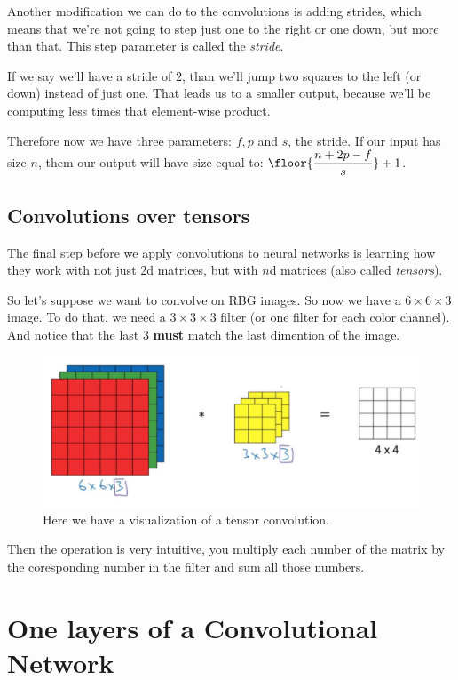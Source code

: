 \documentclass[12pt, a4paper, oneside]{book}
\begin{document}
Another modification we can do to the convolutions is adding strides, which
means that we're not going to step just one to the right or one down, but more
than that. This step parameter is called the \textit{stride}.

If we say we'll have a stride of $2$, than we'll jump two squares to the left
(or down) instead of just one. That leads us to a smaller output, because we'll
be computing less times that element-wise product.

Therefore now we have three parameters: $f,p$ and $s$, the stride. If our input
has size $n$, them our output will have size equal to:
$\floor{\dfrac{n+2p-f}{s}}+1$.

\subsection{Convolutions over tensors}%
\label{sub:convolutions_over_tensors}

The final step before we apply convolutions to neural networks is learning how
they work with not just 2d matrices, but with $n$d matrices (also called
\textit{tensors}).

So let's suppose we want to convolve on RBG images. So now we have a $6\times
6\times 3$ image. To do that, we need a $3\times 3\times 3$ filter (or one
filter for each color channel). And notice that the last $3$ \textbf{must} match
the last dimention of the image.

\begin{figure}[h]
\centering
\includegraphics[scale=0.3]{Res/tensor-convolution.png}
\caption{Here we have a visualization of a tensor convolution.}
\label{tensor-convolution.png}
\end{figure}

Then the operation is very intuitive, you multiply each number of the matrix by
the coresponding number in the filter and sum all those numbers.

\section{One layers of a Convolutional Network}%
\label{sec:one_layers_of_a_convolutional_network}
\end{document}
